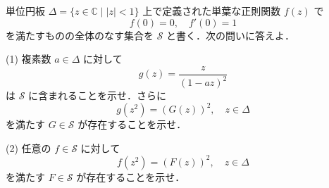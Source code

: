 \documentclass[12pt]{jlreq}
\newcommand{\C}{\mathbb{C}}
\begin{document}
単位円板 \(\Delta = \{ z \in \C \mid |z| < 1 \}\) 上で定義された単葉な正則関数 \(f(z)\) で
\[
  f(0) = 0,\quad f'(0) = 1
\]
を満たすものの全体のなす集合を \(\mathcal{S}\) と書く．次の問いに答えよ．

(1) 複素数 \(a \in \Delta\) に対して
  \[
    g(z) = \frac{z}{(1 - az)^2}
  \]
  は \(\mathcal{S}\) に含まれることを示せ．さらに
  \[
    g(z^2) = (G(z))^2,\quad z \in \Delta
  \]
  を満たす \(G \in \mathcal{S}\) が存在することを示せ．

(2) 任意の \(f \in \mathcal{S}\) に対して
  \[
    f(z^2) = (F(z))^2,\quad z \in \Delta
  \]
  を満たす \(F \in \mathcal{S}\) が存在することを示せ．
\end{document}
